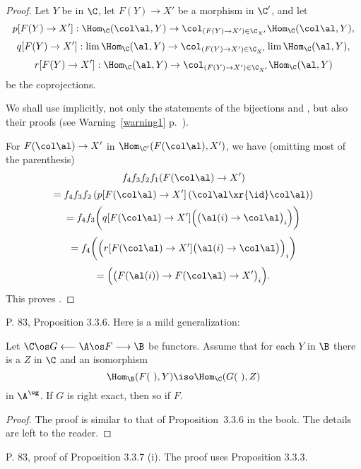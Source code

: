 \documentclass[12pt]{article}
\theoremstyle{remark}
\theoremstyle{definition}
\begin{document}
\begin{s}
\begin{proof}

Let $Y$ be in $\C$, let $F(Y)\to X'$ be a morphism in $\C'$, and let 
$$
p[F(Y)\to X']:\Hom_\C(\col\al,Y)\to\col_{(F(Y)\to X')\in\C_{X'}}\Hom_\C(\col\al,Y),
$$ 
$$
q[F(Y)\to X']:\lim\Hom_\C(\al,Y)\to\col_{(F(Y)\to X')\in\C_{X'}}\lim\Hom_\C(\al,Y),
$$ 
$$
r[F(Y)\to X']:\Hom_\C(\al,Y)\to\col_{(F(Y)\to X')\in\C_{X'}}\Hom_\C(\al,Y)
$$ 
be the coprojections.

We shall use implicitly, not only the statements of the bijections  and , but also their proofs (see Warning~\ref{warning1} p.~). 

For $F(\col\al)\to X'$ in $\Hom_{\C'}(F(\col\al),X')$, we have (omitting most of the parenthesis) 
$$
f_4f_3f_2f_1(F(\col\al)\to X')
$$ 
$$
=f_4f_3f_2\left(p[F(\col\al)\to X']\left(\col\al\xr{\id}\col\al\right)\right)
$$ 
$$
=f_4f_3\bigg(q[F(\col\al)\to X']\Big(\big(\al(i)\to\col\al\big)_i\Big)\bigg)
$$ 
$$
=f_4\bigg(\Big(r[F(\col\al)\to X']\big(\al(i)\to\col\al\big)\Big)_i\bigg)
$$ 
$$
=\Big(\big(F(\al(i))\to F(\col\al)\to X'\big)_i\Big).
$$ 
This proves .
\end{proof}  
\end{s}

%

\begin{s}
P. 83, Proposition 3.3.6. Here is a mild generalization:

\begin{prop}
Let $\C\os G\longleftarrow\A\os F\longrightarrow\B$ be functors. Assume that for each $Y$ in $\B$ there is a $Z$ in $\C$ and an isomorphism 
$$
\Hom_\B(F(\ ),Y)\iso\Hom_\C(G(\ ),Z)
$$
in $\A^\wg$. If $G$ is right exact, then so if $F$.
\end{prop}

\begin{proof}
The proof is similar to that of Proposition~3.3.6 in the book. The details are left to the reader.
\end{proof}
\end{s}

%

\begin{s}
P. 83, proof of Proposition 3.3.7 (i). The proof uses Proposition 3.3.3.
\end{s}

%
\end{document}
